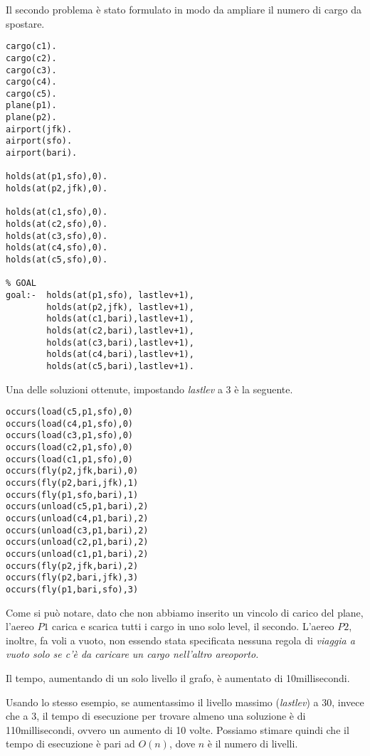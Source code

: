 Il secondo problema è stato formulato in modo da ampliare il numero di cargo da spostare.

\begin{lstlisting}
cargo(c1).
cargo(c2).
cargo(c3).
cargo(c4).
cargo(c5).
plane(p1).
plane(p2).
airport(jfk).
airport(sfo).
airport(bari).

holds(at(p1,sfo),0).
holds(at(p2,jfk),0).

holds(at(c1,sfo),0).
holds(at(c2,sfo),0).
holds(at(c3,sfo),0).
holds(at(c4,sfo),0).
holds(at(c5,sfo),0).

% GOAL
goal:-  holds(at(p1,sfo), lastlev+1),
        holds(at(p2,jfk), lastlev+1),
        holds(at(c1,bari),lastlev+1),
        holds(at(c2,bari),lastlev+1),
        holds(at(c3,bari),lastlev+1),
        holds(at(c4,bari),lastlev+1),
        holds(at(c5,bari),lastlev+1).
\end{lstlisting}

Una delle soluzioni ottenute, impostando \emph{lastlev} a 3 è la seguente.

\begin{lstlisting}
occurs(load(c5,p1,sfo),0)
occurs(load(c4,p1,sfo),0)
occurs(load(c3,p1,sfo),0)
occurs(load(c2,p1,sfo),0)
occurs(load(c1,p1,sfo),0)
occurs(fly(p2,jfk,bari),0)
occurs(fly(p2,bari,jfk),1)
occurs(fly(p1,sfo,bari),1)
occurs(unload(c5,p1,bari),2)
occurs(unload(c4,p1,bari),2)
occurs(unload(c3,p1,bari),2)
occurs(unload(c2,p1,bari),2)
occurs(unload(c1,p1,bari),2)
occurs(fly(p2,jfk,bari),2)
occurs(fly(p2,bari,jfk),3)
occurs(fly(p1,bari,sfo),3)
\end{lstlisting}

Come si può notare, dato che non abbiamo inserito un vincolo di carico del plane, l'aereo $P1$ carica e scarica tutti i cargo in uno solo level, il secondo. L'aereo $P2$, inoltre, fa voli a vuoto, non essendo stata specificata nessuna regola di \emph{viaggia a vuoto solo se c'è da caricare un cargo nell'altro areoporto.}

Il tempo, aumentando di un solo livello il grafo, è aumentato di 10millisecondi.

Usando lo stesso esempio, se aumentassimo il livello massimo (\emph{lastlev}) a 30, invece che a 3, il tempo di esecuzione per trovare almeno una soluzione è di 110millisecondi, ovvero un aumento di 10 volte. Possiamo stimare quindi che il tempo di esecuzione è pari ad $O(n)$, dove $n$ è il numero di livelli.
